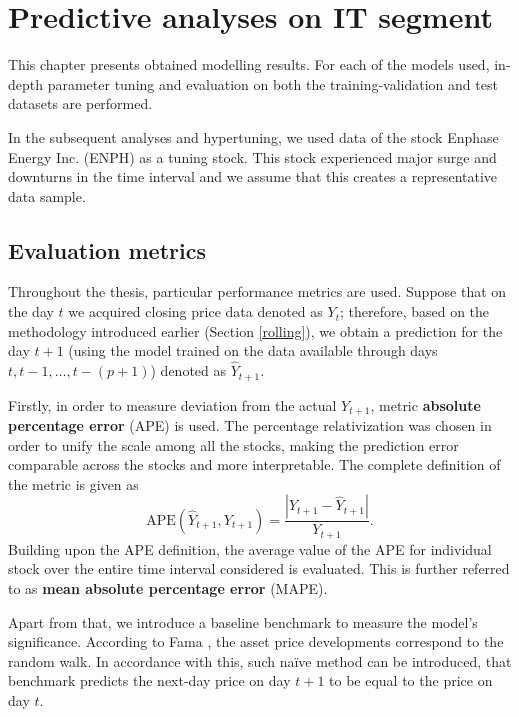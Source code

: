 \chapter{Predictive analyses on IT segment}
\label{chap:3}

This chapter presents obtained modelling results. For each of the models used, in-depth parameter tuning and evaluation 
on both the training-validation and test datasets are performed. 

In the subsequent analyses and hypertuning, we used data of the stock Enphase Energy Inc. (ENPH) as a tuning stock. This stock experienced major surge and downturns in the time interval
and we assume that this creates a representative data sample. 

\section{Evaluation metrics} 

Throughout the thesis, particular performance metrics are used. Suppose that on the day $t$
we acquired closing price data denoted as $Y_t$; therefore, based on the methodology introduced earlier (Section \ref{rolling}),
we obtain a prediction for the day $t+1$ (using the model trained on the data available through days $t, t-1, \ldots, t-(p+1)$) denoted as $\hat{Y}_{t+1}$.

Firstly, in order to measure deviation from the actual $Y_{t+1}$, metric \textbf{absolute percentage error} (APE) is used.
The percentage relativization was chosen in order to unify the scale among all the stocks, making the prediction error comparable
across the stocks and more interpretable. The complete definition of the metric is given as
\begin{equation*}
    \text{APE}(\hat{Y}_{t+1}, Y_{t+1})=\frac{|Y_{t+1}-\hat{Y}_{t+1}|}{Y_{t+1}}.
\end{equation*}
Building upon the APE definition, the average value of the APE for individual stock over the entire time interval considered is evaluated. This is further referred
to as \textbf{mean absolute percentage error} (MAPE).

Apart from that, we introduce a baseline benchmark to measure the model's significance. According to Fama \cite{fama1970efficient}, the asset price developments correspond to 
the random walk. In accordance with this, such naïve method can be introduced, that benchmark predicts the next-day price on day $t+1$
to be equal to the price on day $t$.

